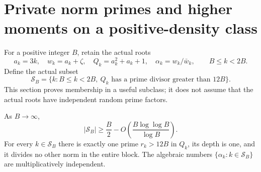 \section{Private norm primes and higher moments on a positive-density class}
\label{pn-section}

For a positive integer \(B\), retain the actual roots
\[
 a_k=3k,\quad w_k=a_k+\zeta,\quad Q_k=a_k^2+a_k+1,\quad
 \alpha_k=w_k/\bar w_k,\qquad B\leq k<2B.
\]
Define the actual subset
\[
 \mathcal{S}_B=\{k:B\leq k<2B,\ Q_k
                    \text{ has a prime divisor greater than }12B\}.
\]
This section proves membership in a useful subclass; it does not
assume that the actual roots have independent random prime factors.

\begin{theorem}
\label{pn-private}
As \(B\to\infty\),
\[
 |\mathcal{S}_B|\geq\frac B2
               -O\!\left(\frac{B\log\log B}{\log B}\right).
\]
For every \(k\in\mathcal{S}_B\) there is exactly one prime
\(r_k>12B\) in \(Q_k\), its depth is one, and it divides no other
norm in the entire block. The algebraic numbers
\(\{\alpha_k:k\in\mathcal{S}_B\}\) are multiplicatively independent.
\end{theorem}
